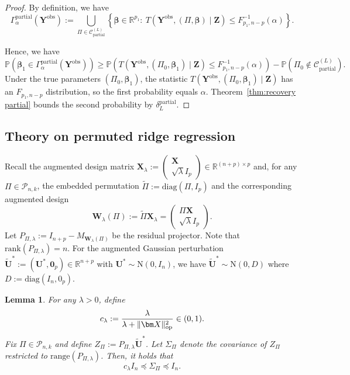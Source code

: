 \documentclass[11pt, reqno]{amsart}
\newcommand{\R}{\mathbb{R}}
\newcommand{\bP}{\mathbb{P}}
\renewcommand{\tilde}{\widetilde}
\renewcommand{\le}{\leqslant}
\renewcommand{\ge}{\geqslant}
\newcommand{\mP}{\mathcal{P}}
\newcommand{\1}{\mbox{1}\hspace{-0.25em}\mbox{l}}
\newcommand{\obs}{\mathrm{obs}}
\newcommand{\Normal}{\mathrm{N}}
\theoremstyle{definition}\newtheorem{problem}{Problem}[section]
\theoremstyle{definition}\newtheorem{definition}[problem]{Definition}
\theoremstyle{remark}\newtheorem{assumption}{Assumption}
\theoremstyle{remark}\newtheorem{remark}[problem]{Remark}
\theoremstyle{definition}\newtheorem{example}[problem]{Example}
\theoremstyle{plain}\newtheorem{theorem}[problem]{Theorem}
\theoremstyle{plain}\newtheorem{question}[problem]{Question}
\theoremstyle{plain}\newtheorem{lemma}[problem]{Lemma}
\theoremstyle{plain}\newtheorem{proposition}[problem]{Proposition}
\theoremstyle{plain}\newtheorem{corollary}[problem]{Corollary}
\theoremstyle{plain}\newtheorem{conjecture}[problem]{Conjecture}
\begin{document}
\begin{proof}
By definition, we have
\begin{equation}\label{eq:confset-partial-beta1}
\Gamma_{\alpha}^{\mathrm{partial}}(\bm{Y}^{\obs})
:=\bigcup_{\Pi \in \mathcal{C}_{\mathrm{partial}}^{(L)}} \left\{
\bm\beta\in \R^{p_1}:\ 
T(\bm{Y}^{\obs}, (\Pi,\bm\beta) \mid \bm Z) \le F_{p_1, n-p}^{-1}(\alpha)
\right\}.
\end{equation}

Hence, we have
\[
\bP\left( \bm{\beta}_1 \in \Gamma_{\alpha}^{\mathrm{partial}}(\bm{Y}^{\obs}) \right)
\ge
\bP\left(
T\left(\bm{Y}^{\obs}, (\Pi_0, \bm{\beta}_1) \mid \bm{Z}\right) \le F_{p_1, n-p}^{-1}(\alpha)
\right)
-
\bP\left( \Pi_0 \notin \mathcal{C}_{\mathrm{partial}}^{(L)} \right).
\]
Under the true parameters $(\Pi_0, \bm{\beta}_1)$, the statistic
$T(\bm{Y}^{\obs}, (\Pi_0, \bm{\beta}_1)\mid \bm{Z})$ has an $F_{p_1, n-p}$ distribution, so the first probability equals $\alpha$.
Theorem~\ref{thm:recovery partial} bounds the second probability by $\delta_L^{\mathrm{partial}}$.
\end{proof}

\subsection{Theory on permuted ridge regression}\label{subsec:ridge_theory}

Recall the augmented design matrix $\bm X_\lambda:=\begin{pmatrix}\bm X\\ \sqrt{\lambda}I_p\end{pmatrix}\in\R^{(n+p)\times p}$ and, for any $\Pi\in\mP_{n,k}$, the embedded permutation $\tilde\Pi:=\mathrm{diag}(\Pi,I_p)$ and the corresponding augmented design
\[
\bm W_\lambda(\Pi):=\tilde\Pi\bm X_\lambda=\begin{pmatrix}\Pi\bm X\\ \sqrt{\lambda}I_p\end{pmatrix}.
\]
Let $P_{\Pi,\lambda}:=I_{n+p}-M_{\bm W_\lambda(\Pi)}$ be the residual projector.  Note that $\mathrm{rank}(P_{\Pi,\lambda})=n$.
For the augmented Gaussian perturbation $\tilde{\bm U}^*:=(\bm U^*,\bm 0_p)\in\R^{n+p}$ with $\bm U^*\sim\Normal(0,I_n)$,
we have $\tilde{\bm U}^*\sim\Normal(0,D)$ where $D:=\mathrm{diag}(I_n,0_p)$.

\begin{lemma}\label{lem:ridge_nondegenerate}
For any $\lambda>0$, define
\[
c_\lambda := \frac{\lambda}{\lambda+\|\bm X\|_{\rm op}^2}\in(0,1).
\]
Fix $\Pi\in\mP_{n,k}$ and define $Z_\Pi:=P_{\Pi,\lambda}\tilde{\bm U}^*$.
Let $\Sigma_\Pi$ denote the covariance of $Z_\Pi$ restricted to $\mathrm{range}(P_{\Pi,\lambda})$.
Then, it holds that
\[
c_\lambda I_n \preceq \Sigma_\Pi \preceq I_n.
\]
\end{lemma}
\end{document}
